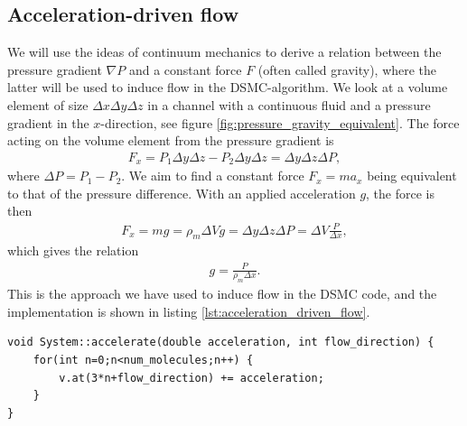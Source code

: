 \subsection{Acceleration-driven flow}
We will use the ideas of continuum mechanics to derive a relation between the pressure gradient $\nabla P$ and a constant force $F$ (often called gravity), where the latter will be used to induce flow in the DSMC-algorithm. We look at a volume element of size $\Delta x\Delta y\Delta z$ in a channel with a continuous fluid and a pressure gradient in the $x$-direction, see figure \ref{fig:pressure_gravity_equivalent}. The force acting on the volume element from the pressure gradient is
\begin{align}
	F_x = P_1\Delta y\Delta z - P_2\Delta y\Delta z = \Delta y\Delta z\Delta P,
\end{align}
where $\Delta P = P_1 - P_2$. We aim to find a constant force $F_x=ma_x$ being equivalent to that of the pressure difference. With an applied acceleration $g$, the force is then
\begin{align}
	F_x = mg = \rho_m \Delta V g = \Delta y\Delta z\Delta P = \Delta V \frac{P}{\Delta x},
\end{align}
which gives the relation
\begin{align}
	g = \frac{P}{\rho_m\Delta x}.
\end{align}
This is the approach we have used to induce flow in the DSMC code, and the implementation is shown in listing \ref{lst:acceleration_driven_flow}.
\begin{lstlisting}[caption=Acceleration of particles in the DSMC code., label=lst:acceleration_driven_flow]
void System::accelerate(double acceleration, int flow_direction) {
    for(int n=0;n<num_molecules;n++) {
        v.at(3*n+flow_direction) += acceleration;
    }
}
\end{lstlisting}

